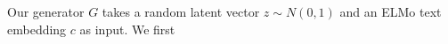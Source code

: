 Our generator $G$ takes a random latent vector $z \sim N(0, 1)$ and an ELMo text embedding $c$ as input. We first 